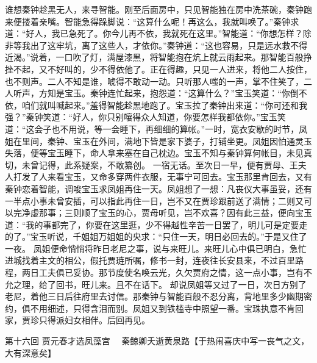 \documentclass[12pt,oneside]{book}
\begin{document}
谁想秦钟趁黑无人，来寻智能。刚至后面房中，只见智能独在房中洗茶碗，秦钟跑来便搂着亲嘴。智能急得跺脚说：“这算什么呢！再这么，我就叫唤了。”秦钟求道：“好人，我已急死了。你今儿再不依，我就死在这里。”智能道：“你想怎样？除非等我出了这牢坑，离了这些人，才依你。”秦钟道：“这也容易，只是远水救不得近渴。”说着，一口吹了灯，满屋漆黑，将智能抱在炕上就云雨起来。那智能百般挣挫不起，又不好叫的，少不得依他了。正在得趣，只见一人进来，将他二人按住，也不则声。二人不知是谁，唬得不敢动一动。只听那人嗤的一声，掌不住笑了，二人听声，方知是宝玉。秦钟连忙起来，抱怨道：“这算什么？”宝玉笑道：“你倒不依，咱们就叫喊起来。”羞得智能趁黑地跑了。宝玉拉了秦钟出来道：“你可还和我强？”秦钟笑道：“好人，你只别嚷得众人知道，你要怎样我都依你。”宝玉笑道：“这会子也不用说，等一会睡下，再细细的算帐。”一时，宽衣安歇的时节，凤姐在里间，秦钟、宝玉在外间，满地下皆是家下婆子，打铺坐更。凤姐因怕通灵玉失落，便等宝玉睡下，命人拿来塞在自己枕边。宝玉不知与秦钟算何帐目，未见真切，未曾记得，此系疑案，不敢纂创。
一宿无话。至次日一早，便有贾母、王夫人打发了人来看宝玉，又命多穿两件衣服，无事宁可回去。宝玉那里肯回去，又有秦钟恋着智能，调唆宝玉求凤姐再住一天。凤姐想了一想：凡丧仪大事虽妥，还有一半点小事未曾安插，可以指此再住一日，岂不又在贾珍跟前送了满情；二则又可以完净虚那事；三则顺了宝玉的心，贾母听见，岂不欢喜？因有此三益，便向宝玉道：“我的事都完了，你要在这里逛，少不得越性辛苦一日罢了，明儿可是定要走的了。”宝玉听说，千姐姐万姐姐的央求：“只住一天，明日必回去的。”于是又住了一夜。
凤姐便命悄悄将昨日老尼之事，说与来旺儿。来旺儿心中俱已明白，急忙进城找着主文的相公，假托贾琏所嘱，修书一封，连夜往长安县来，不过百里路程，两日工夫俱已妥协。那节度使名唤云光，久欠贾府之情，这一点小事，岂有不允之理，给了回书，旺儿来。且不在话下。
却说凤姐等又过了一日，次日方别了老尼，着他三日后往府里去讨信。那秦钟与智能百般不忍分离，背地里多少幽期密约，俱不用细述，只得含泪而别。凤姐又到铁槛寺中照望一番。宝珠执意不肯回家，贾珍只得派妇女相伴。后回再见。

 
第十六回  贾元春才选凤藻宫　
秦鲸卿夭逝黄泉路【于热闹喜庆中写一丧气之文，大有深意矣】
\end{document}
